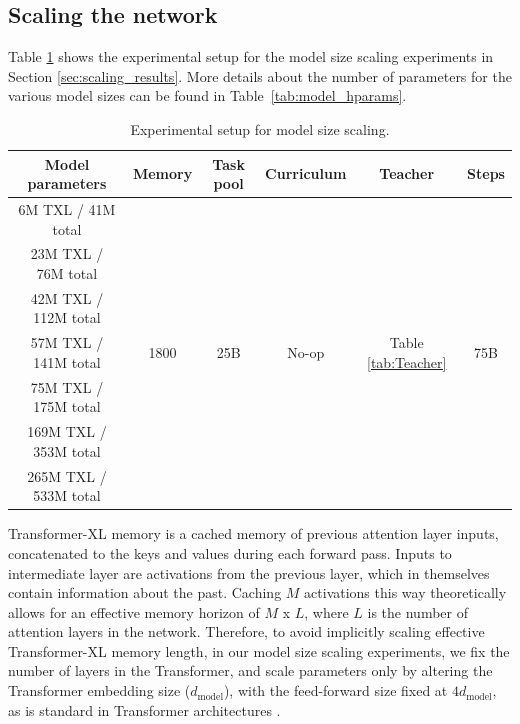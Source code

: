 \documentclass[11pt, a4paper, logo, copyright]{deepmind}
\begin{document}
\begin{appendix}
\subsection{Scaling the network}
\label{app:network-scaling}
Table \ref{tab:model_scaling} shows the experimental setup for the model size scaling experiments in Section \ref{sec:scaling_results}. More details about the number of parameters for the various model sizes can be found in Table~\ref{tab:model_hparams}.
\begin{table}[t!]
  \begin{center}
    \caption{Experimental setup for model size scaling.}
    \begin{tabular}{c|c|c|c|c|c}
    \label{tab:model_scaling}
      Model parameters & Memory & Task pool & Curriculum  & Teacher & Steps \\
      \hline
      6M TXL / 41M total & \multirow{7}{*}{1800} & \multirow{7}{*}{25B} & \multirow{7}{*}{No-op} & \multirow{7}{*}{Table \ref{tab:Teacher}} & \multirow{7}{*}{75B}\\
      23M TXL / 76M total&&&&&\\
      42M TXL / 112M total&&&&&\\
      57M TXL / 141M total&&&&&\\
      75M TXL / 175M total&&&&&\\
      169M TXL / 353M total&&&&&\\
      265M TXL / 533M total&&&&&\\
    \end{tabular}
  \end{center}
\end{table}
Transformer-XL memory is a cached memory of previous attention layer inputs, concatenated to the keys and values during each forward pass. Inputs to intermediate layer are activations from the previous layer, which in themselves contain information about the past. Caching $M$ activations this way theoretically allows for an effective memory horizon of $M$ x $L$, where $L$ is the number of attention layers in the network.
Therefore, to avoid implicitly scaling effective Transformer-XL memory length, in our model size scaling experiments, we fix the number of layers in the Transformer, and scale parameters only by altering the Transformer embedding size ($d_\textrm{model}$), with the feed-forward size fixed at $4 d_\textrm{model}$, as is standard in Transformer architectures \citep{vaswani2017attention}.
\begin{table}[h!]
  \begin{center}

\end{center}
\end{table}
\end{appendix}
\end{document}
